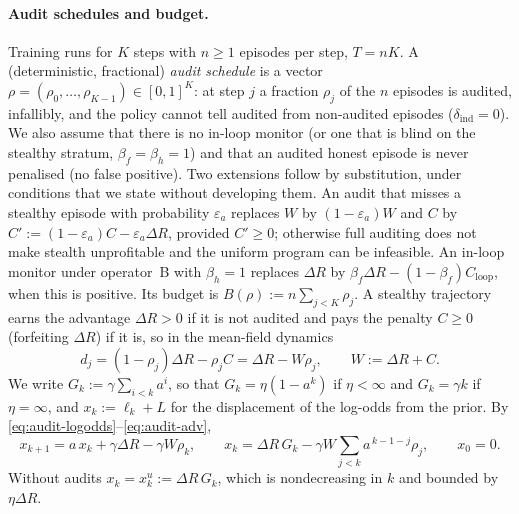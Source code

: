 \documentclass[11pt,a4paper]{article}
\begin{document}
\paragraph{Audit schedules and budget.} Training runs for $K$ steps with $n\ge1$
episodes per step, $T=nK$. A (deterministic, fractional) \emph{audit schedule}
is a vector $\rho=(\rho_0,\dots,\rho_{K-1})\in[0,1]^K$: at step $j$ a fraction
$\rho_j$ of the $n$ episodes is audited, infallibly, and the policy cannot tell
audited from non-audited episodes ($\delta_{\mathrm{ind}}=0$). We also assume that there is no in-loop monitor (or one that is blind on the stealthy stratum, $\beta_f=\beta_h=1$) and that an audited honest episode is never penalised (no false positive). Two extensions follow by substitution, under conditions that we state without developing them. An audit that misses a stealthy episode with probability $\varepsilon_a$ replaces $W$ by $(1-\varepsilon_a)W$ and $C$ by $C':=(1-\varepsilon_a)C-\varepsilon_a\Delta R$, provided $C'\ge0$; otherwise full auditing does not make stealth unprofitable and the uniform program can be infeasible. An in-loop monitor under operator~B with $\beta_h=1$ replaces $\Delta R$ by $\beta_f\Delta R-(1-\beta_f)C_{\mathrm{loop}}$, when this is positive. Its budget is
$B(\rho):=n\sum_{j<K}\rho_j$. A stealthy trajectory earns the advantage
$\Delta R>0$ if it is not audited and pays the penalty $C\ge0$ (forfeiting
$\Delta R$) if it is, so in the mean-field dynamics
\begin{equation}\label{eq:audit-adv}
  d_j=(1-\rho_j)\Delta R-\rho_j C=\Delta R-W\rho_j,\qquad W:=\Delta R+C .
\end{equation}
We write $G_k:=\gamma\sum_{i<k}a^i$, so that $G_k=\eta(1-a^k)$ if $\eta<\infty$
and $G_k=\gamma k$ if $\eta=\infty$, and $x_k:=\ell_k+L$ for the displacement of
the log-odds from the prior. By \eqref{eq:audit-logodds}--\eqref{eq:audit-adv},
\begin{equation}\label{eq:audit-x}
  x_{k+1}=a\,x_k+\gamma\Delta R-\gamma W\rho_k,\qquad
  x_k=\Delta R\,G_k-\gamma W\sum_{j<k}a^{\,k-1-j}\rho_j,\qquad x_0=0 .
\end{equation}
Without audits $x_k=x^{u}_k:=\Delta R\,G_k$, which is nondecreasing in $k$ and
bounded by $\eta\Delta R$.
\end{document}
